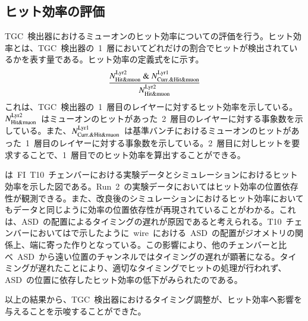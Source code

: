 \subsection{ヒット効率の評価}
TGC~検出器におけるミューオンのヒット効率についての評価を行う。ヒット効率とは、TGC~検出器の~1~層においてどれだけの割合でヒットが検出されているかを表す量である。ヒット効率の定義式をに示す。
\begin{align}
    \frac{N^{\rm{Lyr2}}_{\rm{Hit\&muon}}~\&~N^{\rm{Lyr1}}_{\rm{Curr.\&Hit\&muon}}}{N^{\rm{Lyr2}}_{\rm{Hit\&muon}}} \label{eq:hit}
\end{align}
これは、TGC~検出器の~1~層目のレイヤーに対するヒット効率を示している。$N^{\rm{Lyr2}}_{\rm{Hit\&muon}}$~はミューオンのヒットがあった~2~層目のレイヤーに対する事象数を示している。また、$N^{\rm{Lyr1}}_{\rm{Curr.\&Hit\&muon}}$~は基準バンチにおけるミューオンのヒットがあった~1~層目のレイヤーに対する事象数を示している。2~層目に対しヒットを要求することで、1~層目でのヒット効率を算出することができる。

は~FI~T10~チェンバーにおける実験データとシミュレーションにおけるヒット効率を示した図である。Run~2~の実験データにおいてはヒット効率の位置依存性が観測できる。また、改良後のシミュレーションにおけるヒット効率においてもデータと同じように効率の位置依存性が再現されていることがわかる。これは、ASD~の配置によるタイミングの遅れが原因であると考えられる。T10~チェンバーにおいてはで示したように~wire~における~ASD~の配置がジオメトリの関係上、端に寄った作りとなっている。この影響により、他のチェンバーと比べ~ASD~から遠い位置のチャンネルではタイミングの遅れが顕著になる。タイミングが遅れたことにより、適切なタイミングでヒットの処理が行われず、ASD~の位置に依存したヒット効率の低下がみられたのである。

以上の結果から、TGC~検出器におけるタイミング調整が、ヒット効率へ影響を与えることを示唆することができた。

